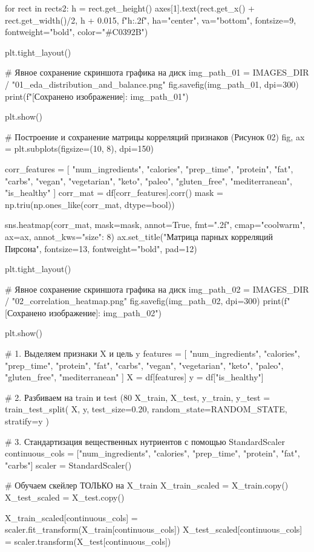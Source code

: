 \documentclass[14pt,a4paper]{extarticle}
\begin{document}
\begin{CodeListing}
for rect in rects2:
    h = rect.get_height()
    axes[1].text(rect.get_x() + rect.get_width()/2, h + 0.015, f"{h:.2f}", ha="center", va="bottom", fontsize=9, fontweight="bold", color="#C0392B")

plt.tight_layout()

# Явное сохранение скриншота графика на диск
img_path_01 = IMAGES_DIR / "01_eda_distribution_and_balance.png"
fig.savefig(img_path_01, dpi=300)
print(f"[Сохранено изображение]: {img_path_01}")

plt.show()

# Построение и сохранение матрицы корреляций признаков (Рисунок 02)
fig, ax = plt.subplots(figsize=(10, 8), dpi=150)

corr_features = [
    "num_ingredients", "calories", "prep_time", "protein", "fat", "carbs",
    "vegan", "vegetarian", "keto", "paleo", "gluten_free", "mediterranean", "is_healthy"
]
corr_mat = df[corr_features].corr()
mask = np.triu(np.ones_like(corr_mat, dtype=bool))

sns.heatmap(corr_mat, mask=mask, annot=True, fmt=".2f", cmap="coolwarm", ax=ax, annot_kws={"size": 8})
ax.set_title("Матрица парных корреляций Пирсона", fontsize=13, fontweight="bold", pad=12)

plt.tight_layout()

# Явное сохранение скриншота графика на диск
img_path_02 = IMAGES_DIR / "02_correlation_heatmap.png"
fig.savefig(img_path_02, dpi=300)
print(f"[Сохранено изображение]: {img_path_02}")

plt.show()

# 1. Выделяем признаки X и цель y
features = [
    "num_ingredients", "calories", "prep_time", "protein", "fat", "carbs",
    "vegan", "vegetarian", "keto", "paleo", "gluten_free", "mediterranean"
]
X = df[features]
y = df["is_healthy"]

# 2. Разбиваем на train и test (80%
X_train, X_test, y_train, y_test = train_test_split(
    X, y, test_size=0.20, random_state=RANDOM_STATE, stratify=y
)

# 3. Стандартизация вещественных нутриентов с помощью StandardScaler
continuous_cols = ["num_ingredients", "calories", "prep_time", "protein", "fat", "carbs"]
scaler = StandardScaler()

# Обучаем скейлер ТОЛЬКО на X_train
X_train_scaled = X_train.copy()
X_test_scaled = X_test.copy()

X_train_scaled[continuous_cols] = scaler.fit_transform(X_train[continuous_cols])
X_test_scaled[continuous_cols] = scaler.transform(X_test[continuous_cols])


\end{CodeListing}
\end{document}
